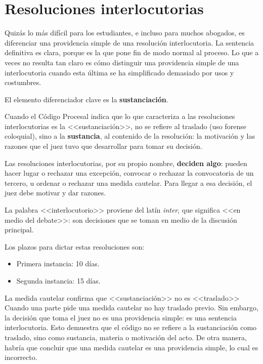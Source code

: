 \documentclass[12pt,oneside]{book}
\begin{document}
\section{Resoluciones interlocutorias}

Quizás lo más difícil para los estudiantes, e incluso para muchos abogados, es diferenciar una providencia simple de una resolución interlocutoria. La sentencia definitiva es clara, porque es la que pone fin de modo normal al proceso. Lo que a veces no resulta tan claro es cómo distinguir una providencia simple de una interlocutoria cuando esta última se ha simplificado demasiado por usos y costumbres.

El elemento diferenciador clave es la \textbf{sustanciación}.

\begin{important}
Cuando el Código Procesal indica que lo que caracteriza a las resoluciones interlocutorias es la <<sustanciación>>, no se refiere al traslado (uso forense coloquial), sino a la \textbf{sustancia}, al contenido de la resolución: la motivación y las razones que el juez tuvo que desarrollar para tomar su decisión.
\end{important}

Las resoluciones interlocutorias, por su propio nombre, \textbf{deciden algo}: pueden hacer lugar o rechazar una excepción, convocar o rechazar la convocatoria de un tercero, u ordenar o rechazar una medida cautelar. Para llegar a esa decisión, el juez debe motivar y dar razones.

La palabra <<interlocutorio>> proviene del latín \textit{inter}, que significa <<en medio del debate>>: son decisiones que se toman en medio de la discusión principal.

Los plazos para dictar estas resoluciones son:

\begin{itemize}
    \item Primera instancia: 10 días.
    \item Segunda instancia: 15 días.
\end{itemize}

\begin{example}{La medida cautelar confirma que <<sustanciación>> no es <<traslado>>}
Cuando una parte pide una medida cautelar no hay traslado previo. Sin embargo, la decisión que toma el juez no es una providencia simple: es una sentencia interlocutoria. Esto demuestra que el código no se refiere a la sustanciación como traslado, sino como sustancia, materia o motivación del acto. De otra manera, habría que concluir que una medida cautelar es una providencia simple, lo cual es incorrecto.
\end{example}
\end{document}
